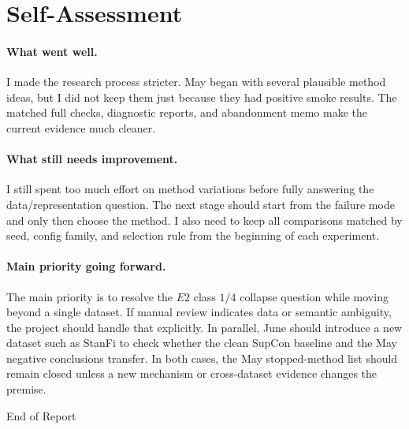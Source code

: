 \documentclass[11pt]{article}
\begin{document}
\section{Self-Assessment}

\paragraph{What went well.}
I made the research process stricter. May began with several plausible method ideas, but I did not keep them just because they had positive smoke results. The matched full checks, diagnostic reports, and abandonment memo make the current evidence much cleaner.

\paragraph{What still needs improvement.}
I still spent too much effort on method variations before fully answering the data/representation question. The next stage should start from the failure mode and only then choose the method. I also need to keep all comparisons matched by seed, config family, and selection rule from the beginning of each experiment.

\paragraph{Main priority going forward.}
The main priority is to resolve the $E2$ class $1/4$ collapse question while moving beyond a single dataset. If manual review indicates data or semantic ambiguity, the project should handle that explicitly. In parallel, June should introduce a new dataset such as StanFi to check whether the clean SupCon baseline and the May negative conclusions transfer. In both cases, the May stopped-method list should remain closed unless a new mechanism or cross-dataset evidence changes the premise.

\vfill
\begin{center}
End of Report
\end{center}
\end{document}

